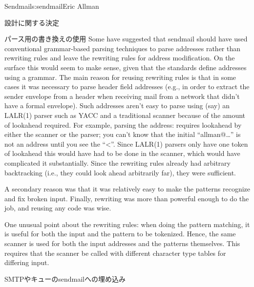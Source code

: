 \begin{aosachapter}{Sendmail}{s:sendmail}{Eric Allman}
\begin{aosasect1}{設計に関する決定}
\begin{aosasect2}{パース用の書き換えの使用}
Some have suggested that sendmail should have used conventional
grammar-based parsing techniques to parse addresses rather than
rewriting rules and leave the rewriting rules for address modification.
On the surface this would seem to make sense, given
that the standards define addresses using a grammar.  The main reason
for reusing rewriting rules is that in some cases it was necessary to
parse header field addresses (e.g., in order to extract the sender
envelope from a header when receiving mail from a network that didn't
have a formal envelope). Such addresses aren't easy to parse using
(say) an LALR(1) parser such as YACC and a traditional scanner because
of the amount of lookahead required. For example, parsing the address:
 requires lookahead by
either the scanner or the parser; you can't know that the initial
``allman@\ldots'' is not an address until you see the
``{\textless}''.
Since LALR(1) parsers only have one token of lookahead
this would have had to be done in the scanner,
which would have complicated it substantially.
Since the rewriting rules already had arbitrary backtracking
(i.e., they could look ahead arbitrarily far),
they were sufficient.

A secondary reason was that it was relatively easy to make the
patterns recognize and fix broken input. Finally, rewriting was more
than powerful enough to do the job, and reusing any code was wise.

One unusual point about the rewriting rules: when doing the pattern
matching, it is useful for both the input and the pattern to be
tokenized. Hence, the same scanner is used for both the input
addresses and the patterns themselves. This requires that the scanner
be called with different character type tables for differing input.

\end{aosasect2}

\begin{aosasect2}{SMTPやキューのsendmailへの埋め込み}


\end{aosasect2}
\end{aosasect1}
\end{aosachapter}
